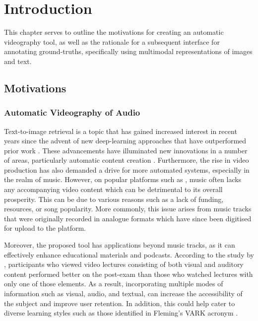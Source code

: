 \documentclass{l4proj}
\begin{document}
\chapter{Introduction}

This chapter serves to outline the motivations for creating an automatic videography tool, as well as the rationale for a subsequent interface for annotating ground-truths, specifically using multimodal representations of images and text. 

\section{Motivations}
\subsection{Automatic Videography of Audio}
Text-to-image retrieval is a topic that has gained increased interest in recent years since the advent of new deep-learning approaches that have outperformed prior work \citep{gordo2017end}. These advancements have illuminated new innovations in a number of areas, particularly automatic content creation \citep{singer2022make}. Furthermore, the rise in video production \citep{tprisevideo} has also demanded a drive for more automated systems, especially in the realm of music. However, on popular platforms such as \cite{youtube}, music often lacks any accompanying video content which can be detrimental to its overall prosperity. This can be due to various reasons such as a lack of funding, resources, or song popularity. More commonly, this issue arises from music tracks that were originally recorded in analogue formats which have since been digitised for upload to the platform.

Moreover, the proposed tool has applications beyond music tracks, as it can effectively enhance educational materials and podcasts. According to the study by \cite{benefits_of_mmv}, participants who viewed video lectures consisting of both visual and auditory content performed better on the post-exam than those who watched lectures with only one of those elements. As a result, incorporating multiple modes of information such as visual, audio, and textual, can increase the accessibility of the subject and improve user retention. In addition, this could help cater to diverse learning styles such as those identified in Fleming's VARK acronym \citep{vark}.
\end{document}
